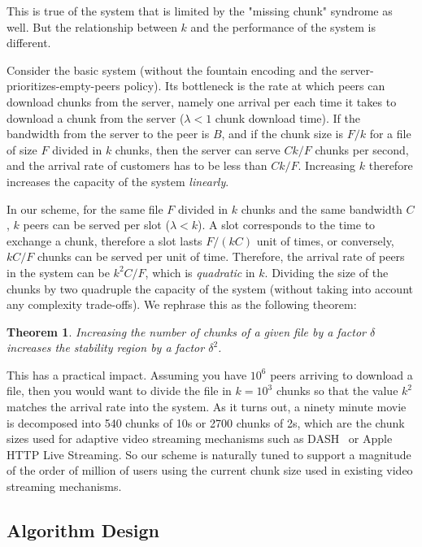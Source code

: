 \documentclass[11pt,conference]{IEEEtran}
\newtheorem{theorem}{Theorem}[section]
\newcommand{\bTheorem}{ \begin{theorem}  }
\newcommand{\eTheorem}{ \end{theorem}    }
\begin{document}
This is true of the system that is limited by the "missing chunk" syndrome as well. But the relationship between $k$ and the performance of the system is different.

Consider the basic system (without the fountain encoding and the server-prioritizes-empty-peers policy). Its bottleneck is the rate at which peers can download chunks from the server, namely one arrival per each time it takes to download a chunk from the server ($\lambda < 1$ chunk download time). If the bandwidth from the server to the peer is $B$, and if the chunk size is $F/k$ for a file of size $F$ divided in $k$ chunks, then the server can serve $Ck/F$ chunks per second, and the arrival rate of customers has to be less than $Ck/F$. Increasing $k$ therefore increases the capacity of the system {\em linearly}.

In our scheme, for the same file $F$ divided in $k$ chunks and the same bandwidth $C$, $k$ peers can be served per slot ($\lambda < k$). A slot corresponds to the time to exchange a chunk, therefore a slot lasts $F/(kC)$ unit of times, or conversely, $kC/F$ chunks can be served per unit of time. Therefore, the arrival rate of peers in the system can be $k^2C/F$, which is {\em quadratic} in $k$. Dividing the size of the chunks by two quadruple the capacity of the system (without taking into account any complexity trade-offs). We rephrase this as the following theorem:

\bTheorem Increasing the number of chunks of a given file by a factor $\delta$ increases the stability region by a factor $\delta^2$.
\eTheorem

This has a practical impact. Assuming you have $10^6$ peers arriving to download a file, then you would want to divide the file in $k= 10^3$ chunks so that the value $k^2$ matches the arrival rate into the system. As it turns out, a ninety minute movie is decomposed into 540 chunks of 10s or 2700 chunks of 2s, which are the chunk sizes used for adaptive video streaming mechanisms such as DASH~\cite{Stoekhammer2011,grandl2013,Lederer2012} or Apple HTTP Live Streaming. So our scheme is naturally tuned to support a magnitude of the order of million of users using the current chunk size used in existing video streaming mechanisms.

\subsection{Algorithm Design}
\end{document}
